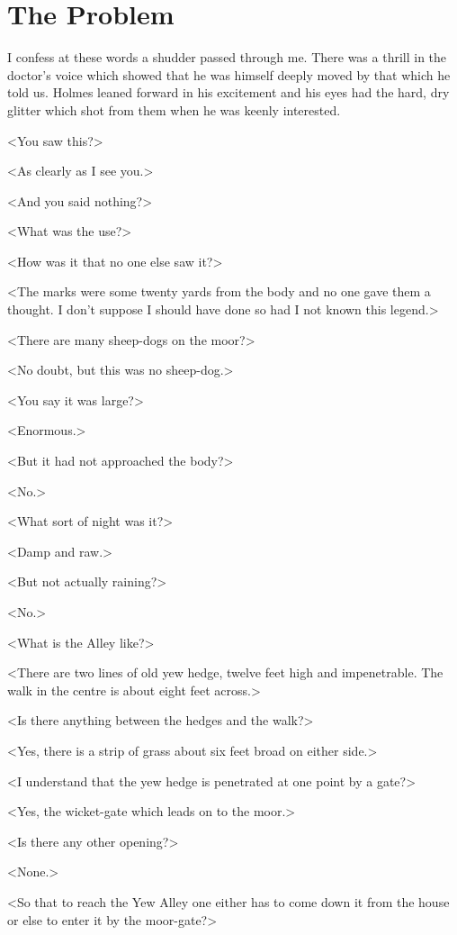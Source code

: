 \chapter{The Problem}
\lettrine{I}{} confess at these words a shudder passed through me. There was a thrill in the doctor's voice which showed that he was himself deeply moved by that which he told us. Holmes leaned forward in his excitement and his eyes had the hard, dry glitter which shot from them when he was keenly interested.

<You saw this?>

<As clearly as I see you.>

<And you said nothing?>

<What was the use?>

<How was it that no one else saw it?>

<The marks were some twenty yards from the body and no one gave them a thought. I don't suppose I should have done so had I not known this legend.>

<There are many sheep-dogs on the moor?>

<No doubt, but this was no sheep-dog.>

<You say it was large?>

<Enormous.>

<But it had not approached the body?>

<No.>

<What sort of night was it?>

<Damp and raw.>

<But not actually raining?>

<No.>

<What is the Alley like?>

<There are two lines of old yew hedge, twelve feet high and impenetrable. The walk in the centre is about eight feet across.>

<Is there anything between the hedges and the walk?>

<Yes, there is a strip of grass about six feet broad on either side.>

<I understand that the yew hedge is penetrated at one point by a gate?>

<Yes, the wicket-gate which leads on to the moor.>

<Is there any other opening?>

<None.>

<So that to reach the Yew Alley one either has to come down it from the house or else to enter it by the moor-gate?>

